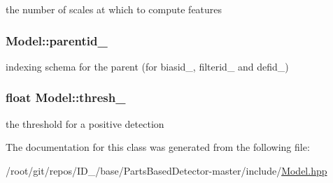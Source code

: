 the number of scales at which to compute features 

\hypertarget{classModel_a4e1151fe7911f52ec75944eff1b257f4}{
\subsubsection[{parentid\-\_\-}]{ {\bf \-Model\-::parentid\-\_\-}}}\label{classModel_a4e1151fe7911f52ec75944eff1b257f4}


indexing schema for the parent (for biasid\-\_\-, filterid\-\_\- and defid\-\_\-) 

\hypertarget{classModel_ac2263c14bbd27a5fed433494354e2b02}{
\subsubsection[{thresh\-\_\-}]{\setlength{\rightskip}{0pt plus 5cm}float {\bf \-Model\-::thresh\-\_\-}}}\label{classModel_ac2263c14bbd27a5fed433494354e2b02}


the threshold for a positive detection 



\-The documentation for this class was generated from the following file\-:\begin{DoxyCompactItemize}
\item 
/root/git/repos/\-I\-D\-\_/base/\-Parts\-Based\-Detector-\/master/include/\hyperlink{Model_8hpp}{\-Model.\-hpp}\end{DoxyCompactItemize}
